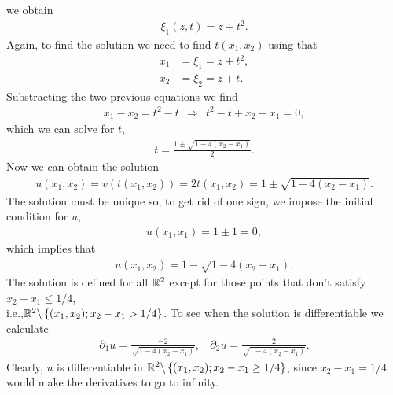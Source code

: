 \begin{questions}
\begin{solution}
we obtain
\begin{align*}
\xi_1(z,t)=z+t^2.
\end{align*}
Again, to find the solution we need to find $t(x_1,x_2)$ using that
\begin{align*}
x_1&=\xi_1=z+t^2,\\
x_2&=\xi_2=z+t.
\end{align*}
Substracting the two previous equations we find
\begin{align*}
x_1-x_2=t^2-t~~\Rightarrow~~t^2-t+x_2-x_1=0,
\end{align*}
which we can solve for $t$,
\begin{align*}
t=\frac{1\pm\sqrt{1-4(x_2-x_1)}}{2}.
\end{align*}
Now we can obtain the solution
\begin{align*}
u(x_1,x_2)=v(t(x_1,x_2))=2t(x_1,x_2)=1\pm\sqrt{1-4(x_2-x_1)}.
\end{align*}
The solution must be unique so, to get rid of one sign, we impose the initial condition for $u$,
\begin{align*}
u(x_1,x_1)=1\pm 1=0,
\end{align*}
which implies that
\begin{align*}
u(x_1,x_2)=1-\sqrt{1-4(x_2-x_1)}.
\end{align*}
The solution is defined for all $\mathbb{R}^2$ except for those points that don't satisfy $x_2-x_1\leq 1/4$,\\ i.e.,$\mathbb{R}^2\backslash\left\lbrace (x_1,x_2);x_2-x_1>1/4\right\rbrace$. To see when the solution is differentiable we calculate
\begin{align*}
\partial_1u=\frac{-2}{\sqrt{1-4(x_2-x_1)}},~~~~\partial_2u=\frac{2}{\sqrt{1-4(x_2-x_1)}}.
\end{align*}
Clearly, $u$ is differentiable in $\mathbb{R}^2\backslash\left\lbrace (x_1,x_2);x_2-x_1\geq 1/4\right\rbrace$, since $x_2-x_1=1/4$ would make the derivatives to go to infinity.
\end{solution}
\end{questions}